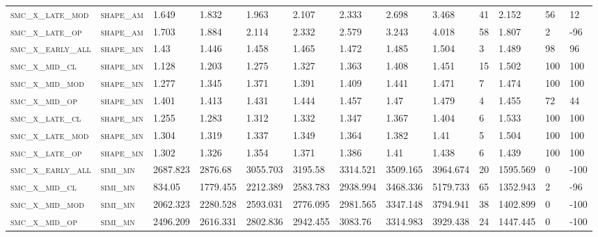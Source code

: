 \begin{landscape}
\begin{center}
\begin{footnotesize}
\begin{longtable}{lllllllllllll}
\textsc{smc\_x\_late\_mod } & \textsc{shape\_am }   & 1.649    & 1.832    & 1.963    & 2.107    & 2.333    & 2.698    & 3.468    & 41  & 2.152    & 56  & 12     \\
\textsc{smc\_x\_late\_op  } & \textsc{shape\_am }   & 1.703    & 1.884    & 2.114    & 2.332    & 2.579    & 3.243    & 4.018    & 58  & 1.807    & 2   & -96    \\
\textsc{smc\_x\_early\_all} & \textsc{shape\_mn }   & 1.43     & 1.446    & 1.458    & 1.465    & 1.472    & 1.485    & 1.504    & 3   & 1.489    & 98  & 96     \\
\textsc{smc\_x\_mid\_cl   } & \textsc{shape\_mn }   & 1.128    & 1.203    & 1.275    & 1.327    & 1.363    & 1.408    & 1.451    & 15  & 1.502    & 100 & 100    \\
\textsc{smc\_x\_mid\_mod  } & \textsc{shape\_mn }   & 1.277    & 1.345    & 1.371    & 1.391    & 1.409    & 1.441    & 1.471    & 7   & 1.474    & 100 & 100    \\
\textsc{smc\_x\_mid\_op   } & \textsc{shape\_mn }   & 1.401    & 1.413    & 1.431    & 1.444    & 1.457    & 1.47     & 1.479    & 4   & 1.455    & 72  & 44     \\
\textsc{smc\_x\_late\_cl  } & \textsc{shape\_mn }   & 1.255    & 1.283    & 1.312    & 1.332    & 1.347    & 1.367    & 1.404    & 6   & 1.533    & 100 & 100    \\
\textsc{smc\_x\_late\_mod } & \textsc{shape\_mn }   & 1.304    & 1.319    & 1.337    & 1.349    & 1.364    & 1.382    & 1.41     & 5   & 1.504    & 100 & 100    \\
\textsc{smc\_x\_late\_op  } & \textsc{shape\_mn }   & 1.302    & 1.326    & 1.354    & 1.371    & 1.386    & 1.41     & 1.438    & 6   & 1.439    & 100 & 100    \\
\textsc{smc\_x\_early\_all} & \textsc{simi\_mn  }   & 2687.823 & 2876.68  & 3055.703 & 3195.58  & 3314.521 & 3509.165 & 3964.674 & 20  & 1595.569 & 0   & -100   \\
\textsc{smc\_x\_mid\_cl   } & \textsc{simi\_mn  }   & 834.05   & 1779.455 & 2212.389 & 2583.783 & 2938.994 & 3468.336 & 5179.733 & 65  & 1352.943 & 2   & -96    \\
\textsc{smc\_x\_mid\_mod  } & \textsc{simi\_mn  }   & 2062.323 & 2280.528 & 2593.031 & 2776.095 & 2981.565 & 3347.148 & 3794.941 & 38  & 1402.899 & 0   & -100   \\
\textsc{smc\_x\_mid\_op   } & \textsc{simi\_mn  }   & 2496.209 & 2616.331 & 2802.836 & 2942.455 & 3083.76  & 3314.983 & 3929.438 & 24  & 1447.445 & 0   & -100   \\

\end{longtable}
\end{footnotesize}
\end{center}
\end{landscape}
